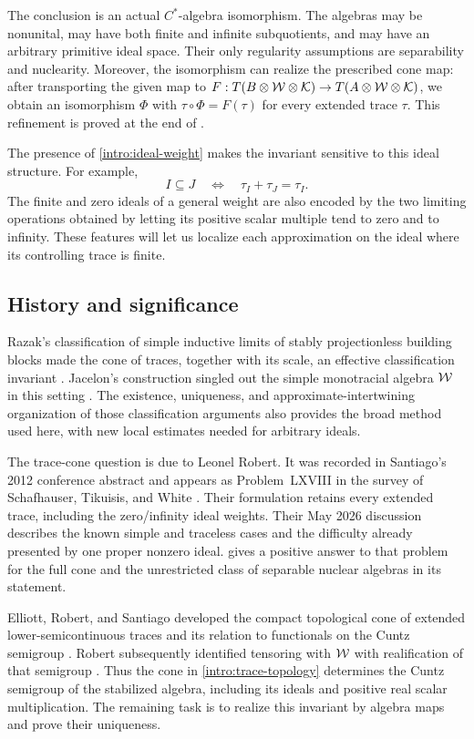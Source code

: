 The conclusion is an actual \(C^*\)-algebra isomorphism.
The algebras may be nonunital, may have both finite and infinite
subquotients, and may have an arbitrary primitive ideal space.
Their only regularity assumptions are separability and nuclearity.
Moreover, the isomorphism can realize the prescribed cone map: after
transporting the given map to
\(F:T(B\otimes\mathcal W\otimes\mathcal K)\to T(A\otimes\mathcal W\otimes\mathcal K)\),
we obtain an isomorphism \(\Phi\) with
\(\tau\circ\Phi=F(\tau)\) for every extended trace \(\tau\).
This refinement is proved at the end of .

The presence of \eqref{intro:ideal-weight} makes the invariant sensitive
to this ideal structure. For example,
\[
 I\subseteq J
 \quad\Longleftrightarrow\quad
 \tau_I+\tau_J=\tau_I.
\]
The finite and zero ideals of a general weight are also encoded by the
two limiting operations obtained by letting its positive scalar
multiple tend to zero and to infinity. These features will let us
localize each approximation on the ideal where its controlling trace
is finite.

\subsection{History and significance}

Razak's classification of simple inductive limits of stably
projectionless building blocks made the cone of traces, together with
its scale, an effective classification invariant
\cite[Theorems~1.1 and~2.1]{Razak}. Jacelon's construction singled out
the simple monotracial algebra $\mathcal W$ in this setting \cite{Jacelon}.
The existence, uniqueness, and approximate-intertwining organization
of those classification arguments also provides the broad method used
here, with new local estimates needed for arbitrary ideals.

The trace-cone question is due to Leonel Robert. It was recorded in
Santiago's 2012 conference abstract \cite{SantiagoWStable} and appears
as Problem~LXVIII in the survey of Schafhauser, Tikuisis, and White
\cite{STW}. Their formulation retains every extended trace, including
the zero/infinity ideal weights. Their May 2026 discussion describes
the known simple and traceless cases and the difficulty already
presented by one proper nonzero ideal.  gives a positive
answer to that problem for the full cone and the unrestricted class of
separable nuclear algebras in its statement.

Elliott, Robert, and Santiago developed the compact topological cone
of extended lower-semicontinuous traces and its relation to
functionals on the Cuntz semigroup \cite{ERS}.
Robert subsequently identified tensoring with $\mathcal W$ with
realification of that semigroup \cite[Theorem~5.1.2]{Robert}.
Thus the cone in \eqref{intro:trace-topology} determines the Cuntz
semigroup of the stabilized algebra, including its ideals and
positive real scalar multiplication. The remaining task is to realize
this invariant by algebra maps and prove their uniqueness.

